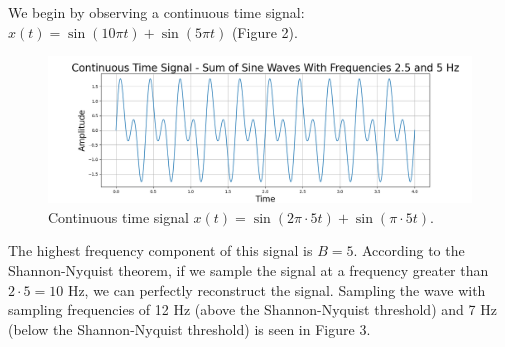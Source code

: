 \documentclass{article}
\begin{document}
We begin by observing a continuous time signal: $x(t) = \sin(10\pi t) + \sin(5\pi t)$ (Figure 2). 
\begin{figure}[H]
    \centering
    \includegraphics[width=\linewidth]{images/ogtimedom.png}
    \caption{Continuous time signal $x(t) = \sin(2\pi\cdot5t) + \sin(\pi\cdot5t)$.}
    \label{fig:enter-label}
\end{figure}
The highest frequency component of this signal is $B = 5$. 
According to the Shannon-Nyquist theorem, if we sample the signal at a frequency greater than $2\cdot 5 = 10$ Hz, we can perfectly reconstruct the signal.
Sampling the wave with sampling frequencies of 12 Hz (above the Shannon-Nyquist threshold) and 7 Hz (below the Shannon-Nyquist threshold) is seen in Figure 3.
\end{document}
